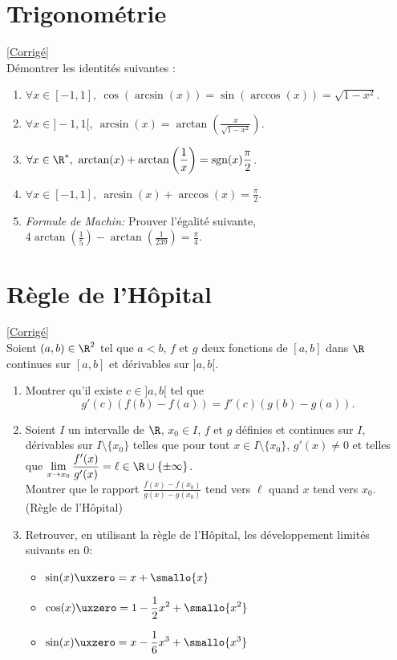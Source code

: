 \documentclass{book}
\begin{document}
	\section{Trigonométrie }
	\textcolor{blue}{\hyperref[Trigonométrie corrigé]{[Corrigé]}}\\
	\label{Trigonométrie}
	Démontrer les identités suivantes :
	\begin{enumerate}
		\item $\forall x\in [-1,1],\ \cos(\arcsin(x))=\sin(\arccos(x))=\sqrt{1-x^2}$.
		\item $\forall x\in]-1,1[,\ \arcsin(x)=\arctan\left(\displaystyle\frac{x}{\sqrt{1-x^2}}\right)$.
		\item $\forall x\in\R^*,\ \arctan(x) +\arctan\left(\displaystyle\frac{1}{x}\right)=\operatorname{sgn}(x)\displaystyle\frac{\pi}{2}$.
		\item $\forall x\in[-1,1], \ \arcsin(x)+\arccos(x)=\displaystyle\frac{\pi}{2}$.
		\item \textit{Formule de Machin:} Prouver l'égalité suivante, $\displaystyle 4\arctan\left(\frac{1}{5}\right)-\arctan\left(\frac{1}{239}\right)=\frac{\pi}{4}$.
	\end{enumerate}
	
	\section{Règle de l'Hôpital }
	\textcolor{blue}{\hyperref[Règle de l'Hôpital]{[Corrigé]}}\\
	\label{Règle de l'Hôpital}
	Soient $(a,b)\in\R^2$ tel que $a<b$, $f$ et $g$ deux fonctions de $[a,b]$ dans $\R$ continues sur $[a,b]$ et dérivables sur $]a,b[$.
	\begin{enumerate}
		\item Montrer qu'il existe $c\in]a,b[$ tel que $$g'(c)(f(b)-f(a))=f'(c)(g(b)-g(a)).$$
		\item Soient $I$ un intervalle de $\R$, $x_0\in I$, $f$ et $g$ définies et continues sur $I$, dérivables sur $I\setminus\{x_0\}$ telles que pour tout $x\in I\setminus\{x_0\}$, $g'(x)\ne0$ et telles que $\displaystyle\lim_{x\to x_0}\frac{f'(x)}{g'(x)}=\ell\in\R\cup\{\pm\infty\}$.
		\\Montrer que le rapport $\displaystyle\frac{f(x)-f(x_0)}{g(x)-g(x_0)}$ tend vers $\ell$ quand $x$ tend vers $x_0$. (Règle de l'Hôpital)
		\item Retrouver, en utilisant la règle de l'Hôpital, les développement limités suivants en $0$:
		\begin{itemize}
			\item $\sin(x)\uxzero=x+\smallo{x}$
			\item $\displaystyle\cos(x)\uxzero=1-\frac{1}{2}x^2+\smallo{x^2}$
			\item $\displaystyle\sin(x)\uxzero=x-\frac{1}{6}x^3+\smallo{x^3}$
		\end{itemize}
	\end{enumerate}
	
\end{document}
